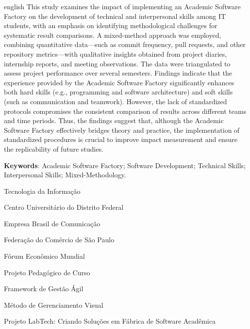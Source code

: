 \documentclass[
	12pt,           %
	openright,      %
	oneside,        %
	a4paper,        %
	brazil          %
]{abntex2}
\begin{document}
\begin{resumo}[Abstract]
    \begin{otherlanguage*}{english}
        This study examines the impact of implementing an Academic Software Factory on the development of technical and interpersonal skills among IT students, with an emphasis on identifying methodological challenges for systematic result comparisons. A mixed-method approach was employed, combining quantitative data—such as commit frequency, pull requests, and other repository metrics—with qualitative insights obtained from project diaries, internship reports, and meeting observations. The data were triangulated to assess project performance over several semesters. Findings indicate that the experience provided by the Academic Software Factory significantly enhances both hard skills (e.g., programming and software architecture) and soft skills (such as communication and teamwork). However, the lack of standardized protocols compromises the consistent comparison of results across different teams and time periods. Thus, the findings suggest that, although the Academic Software Factory effectively bridges theory and practice, the implementation of standardized procedures is crucial to improve impact measurement and ensure the replicability of future studies.
        
        \vspace{\onelineskip}
        
        \noindent
        \textbf{Keywords}: Academic Software Factory; Software Development; Technical Skills; Interpersonal Skills; Mixed-Methodology.
    \end{otherlanguage*}
\end{resumo}



\listoffigures*
\cleardoublepage

\listoftables*
\cleardoublepage

\begin{siglas}
  \item[TI] Tecnologia da Informação
  \item[UDF] Centro Universitário do Distrito Federal
  \item[EBC] Empresa Brasil de Comunicação
  \item[FecomercioSP] Federação do Comércio de São Paulo
  \item[WEF] Fórum Econômico Mundial
  \item[PCN] Projeto Pedagógico de Curso
  \item[SCRUM] Framework de Gestão Ágil
  \item[KANBAN] Método de Gerenciamento Visual
  \item[LabTech] Projeto LabTech: Criando Soluções em Fábrica de Software Acadêmica
\end{siglas}
\end{document}

